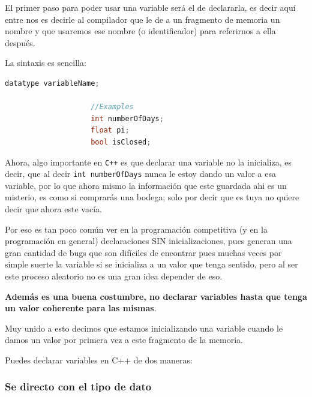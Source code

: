\documentclass[12pt, fleqn]{report}                             %
\theoremstyle{break}                                            %
\newcommand{\textCode}[1]  { \texttt{#1} }                      %
\newcommand{\Cpp}{\ignorespaces\textCode{C++}}                  %
\begin{document}
                El primer paso para poder usar una variable será el de declararla, es decir
                aquí entre nos es decirle al compilador que le de a un fragmento de memoria 
                un nombre y que usaremos ese nombre (o identificador) para referirnos a ella después.

                La sintaxis es sencilla:
                \begin{lstlisting}[language=C++, gobble=20]
                    datatype variableName;

                    //Examples
                    int numberOfDays;
                    float pi;
                    bool isClosed;
                \end{lstlisting}

                Ahora, algo importante en \Cpp es que declarar una variable no la inicializa, 
                es decir, que al decir \textCode{int numberOfDays} nunca le estoy dando un valor a
                esa variable, por lo que ahora mismo la información que este guardada ahi es un misterio,
                es como si comprarás una bodega; solo por decir que es tuya no quiere decir que ahora este
                vacía.

                Por eso es tan poco común ver en la programación competitiva (y en la programación en general)
                declaraciones SIN inicializaciones,
                pues generan una gran cantidad de bugs que son difíciles de encontrar pues muchas veces
                por simple suerte la variable si se inicializa a un valor que tenga sentido, pero
                al ser este proceso aleatorio no es una gran idea depender de eso.

                \textbf{Además es una buena costumbre, no declarar variables hasta que tenga un valor coherente para
                las mismas}.

                \clearpage

                Muy unido a esto decimos que estamos inicializando una variable cuando le damos
                un valor por primera vez a este fragmento de la memoria.
                
                Puedes declarar variables en C++ de dos maneras:

                \subsubsection{Se directo con el tipo de dato}
\end{document}
